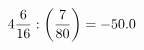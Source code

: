 \documentclass[preview]{standalone}
\begin{document}
\begin{align*}
4 { 6 \over 16 }  :  \left( { 7 \over 80 } \right) = -50.0
\end{align*}
\end{document}
